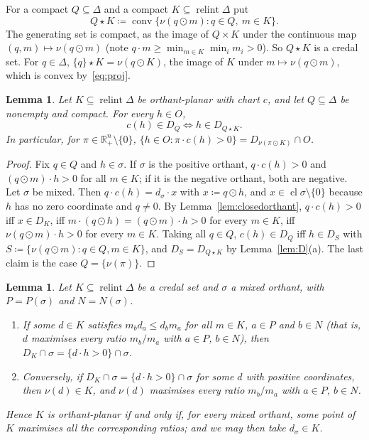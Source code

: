 \documentclass[11pt]{article}
\newcommand{\R}{\mathbb{R}}
\DeclareMathOperator{\conv}{conv}
\DeclareMathOperator{\relint}{relint}
\DeclareMathOperator{\cl}{cl}
\theoremstyle{plain}
\newtheorem{lemma}[theorem]{Lemma}
\theoremstyle{definition}
\theoremstyle{remark}
\begin{document}
For a compact $Q\subseteq\Delta$ and a compact $K\subseteq\relint\Delta$ put
\[
  Q\star K\coloneqq\conv\{\nu(q\odot m):q\in Q,\ m\in K\}.
\]
The generating set is compact, as the image of $Q\times K$ under the continuous map
$(q,m)\mapsto\nu(q\odot m)$ (note $q\cdot m\ge\min_{m\in K}\min_im_i>0$). So $Q\star K$
is a credal set. For $q\in\Delta$, $\{q\}\star K=\nu(q\odot K)$, the image of $K$ under
$m\mapsto\nu(q\odot m)$, which is convex by~\eqref{eq:proj}.

\begin{lemma}\label{lem:pullback}
Let $K\subseteq\relint\Delta$ be orthant-planar with chart $c$, and let $Q\subseteq\Delta$
be nonempty and compact. For every $h\in O$,
\[
  c(h)\in D_Q\iff h\in D_{Q\star K}.
\]
In particular, for $\pi\in\R^n_+\setminus\{0\}$, $\{h\in O:\pi\cdot c(h)>0\}=
D_{\nu(\pi\odot K)}\cap O$.
\end{lemma}

\begin{proof}
Fix $q\in Q$ and $h\in\sigma$. If $\sigma$ is the positive orthant, $q\cdot c(h)>0$ and
$(q\odot m)\cdot h>0$ for all $m\in K$; if it is the negative orthant, both are negative.
Let $\sigma$ be mixed. Then $q\cdot c(h)=d_\sigma\cdot x$ with $x\coloneqq q\odot h$, and
$x\in\cl\sigma\setminus\{0\}$ because $h$ has no zero coordinate and $q\neq0$. By
Lemma~\ref{lem:closedorthant}, $q\cdot c(h)>0$ iff $x\in D_K$, iff $m\cdot(q\odot h)=
(q\odot m)\cdot h>0$ for every $m\in K$, iff $\nu(q\odot m)\cdot h>0$ for every $m\in K$.
Taking all $q\in Q$, $c(h)\in D_Q$ iff $h\in D_S$ with $S\coloneqq\{\nu(q\odot m):q\in
Q,m\in K\}$, and $D_S=D_{Q\star K}$ by Lemma~\ref{lem:D}(a). The last claim is the case
$Q=\{\nu(\pi)\}$.
\end{proof}

\begin{lemma}\label{lem:ratio}
Let $K\subseteq\relint\Delta$ be a credal set and $\sigma$ a mixed orthant, with
$P=P(\sigma)$ and $N=N(\sigma)$.
\begin{enumerate}[label=(\alph*)]
  \item If some $d\in K$ satisfies $m_bd_a\le d_bm_a$ for all $m\in K$, $a\in P$ and $b\in
  N$ (that is, $d$ maximises every ratio $m_b/m_a$ with $a\in P$, $b\in N$), then
  $D_K\cap\sigma=\{d\cdot h>0\}\cap\sigma$.
  \item Conversely, if $D_K\cap\sigma=\{d\cdot h>0\}\cap\sigma$ for some $d$ with positive
  coordinates, then $\nu(d)\in K$, and $\nu(d)$ maximises every ratio $m_b/m_a$ with $a\in
  P$, $b\in N$.
\end{enumerate}
Hence $K$ is orthant-planar if and only if, for every mixed orthant, some point of $K$
maximises all the corresponding ratios; and we may then take $d_\sigma\in K$.
\end{lemma}
\end{document}

